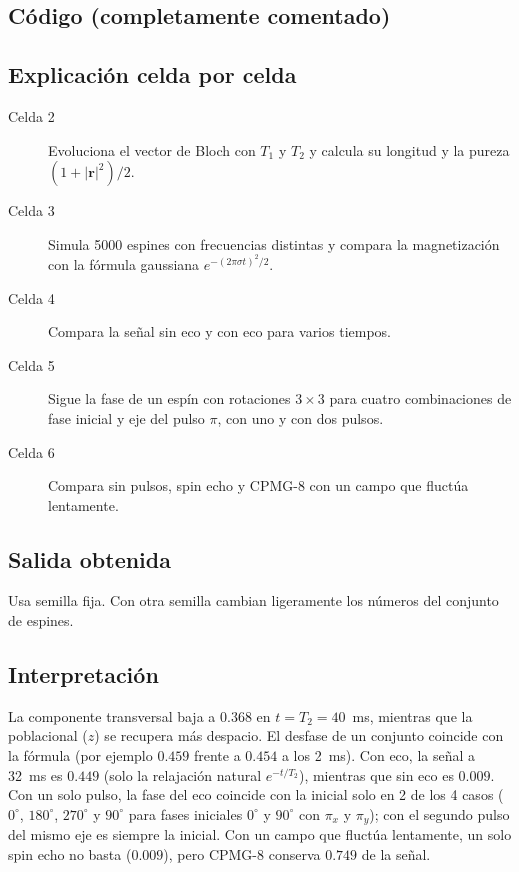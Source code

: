 \subsection{Código (completamente comentado)}


\subsection{Explicación celda por celda}
\begin{description}
  \item[Celda 2] Evoluciona el vector de Bloch con $T_1$ y $T_2$ y calcula su
    longitud y la pureza $(1+|\mathbf r|^2)/2$.
  \item[Celda 3] Simula 5000 espines con frecuencias distintas y compara la
    magnetización con la fórmula gaussiana $e^{-(2\pi\sigma t)^2/2}$.
  \item[Celda 4] Compara la señal sin eco y con eco para varios tiempos.
  \item[Celda 5] Sigue la fase de un espín con rotaciones $3\times3$ para
    cuatro combinaciones de fase inicial y eje del pulso $\pi$, con uno y
    con dos pulsos.
  \item[Celda 6] Compara sin pulsos, spin echo y CPMG-8 con un campo que
    fluctúa lentamente.
\end{description}

\subsection{Salida obtenida}

Usa semilla fija. Con otra semilla cambian ligeramente los números del
conjunto de espines.

\subsection{Interpretación}
La componente transversal baja a $0.368$ en $t=T_2=40$~ms, mientras que la
poblacional ($z$) se recupera más despacio. El desfase de un conjunto coincide con
la fórmula (por ejemplo $0.459$ frente a $0.454$ a los 2~ms). Con eco, la señal
a 32~ms es $0.449$ (solo la relajación natural $e^{-t/T_2}$), mientras que
sin eco es $0.009$. Con un solo pulso, la fase del eco coincide con la inicial solo en 2 de
los 4 casos ($0^\circ$, $180^\circ$, $270^\circ$ y $90^\circ$ para fases
iniciales $0^\circ$ y $90^\circ$ con $\pi_x$ y $\pi_y$); con el segundo pulso
del mismo eje es siempre la inicial. Con un campo que fluctúa lentamente, un solo spin echo no
basta ($0.009$), pero CPMG-8 conserva $0.749$ de la señal.

